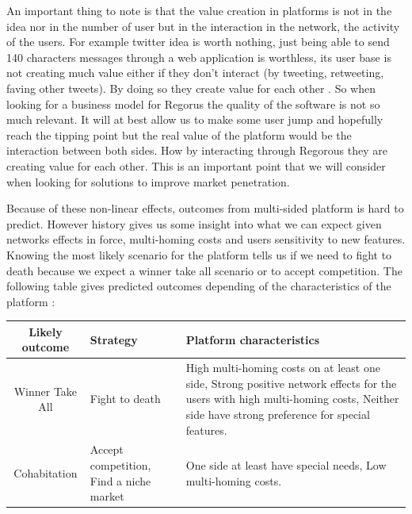 \documentclass[10pt]{report}
\begin{document}
An important thing to note is that the value creation in platforms is not in the idea nor in the number of user but in the interaction in the network, the activity of the users. For example twitter idea is worth nothing, just being able to send 140 characters messages through a web application is worthless, its user base is not creating much value either if they don't interact (by tweeting, retweeting, faving other tweets). By doing so they create value for each other \autocite{Choudary2014}. So when looking for a business model for Regorus the quality of the software is not so much relevant. It will at best allow us to make some user jump and hopefully reach the tipping point but the real value of the platform would be the interaction between both sides. How by interacting through Regorous they are creating value for each other. This is an important point that we will consider when looking for solutions to improve market penetration. \autocite{economides2006}

Because of these non-linear effects, outcomes from multi-sided platform is hard to predict. However history gives us some insight into what we can expect given networks effects in force, multi-homing costs and users sensitivity to new features. Knowing the most likely scenario for the platform tells us if we need to fight to death because we expect a winner take all scenario or to accept competition. The following table gives predicted outcomes depending of the characteristics of the platform :

\begin{center}
\begin{tabularx}{15cm}{|c|p{3.5cm}|X|}
\hline
Likely outcome & Strategy & Platform characteristics \tabularnewline
\hline
Winner Take All & Fight to death & High multi-homing costs on at least one side, Strong positive network effects for the users with high multi-homing costs, Neither side have strong preference for special features.\\
\hline
Cohabitation & Accept competition, Find a niche market & One side at least have special needs, Low multi-homing costs.\\
\hline
\end{tabularx}
\end{center}
\end{document}
